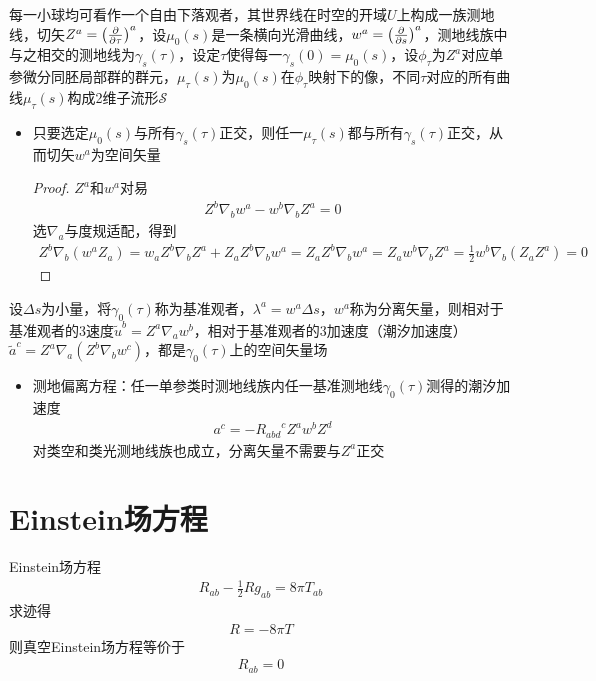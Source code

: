 每一小球均可看作一个自由下落观者，其世界线在时空的开域$U$上构成一族测地线，切矢$Z^a=\left(\frac{\partial }{\partial \tau}\right)^a$，设$\mu_0(s)$是一条横向光滑曲线，$w^a=\left(\frac{\partial }{\partial s}\right)^a$，测地线族中与之相交的测地线为$\gamma_s(\tau)$，设定$\tau$使得每一$\gamma_s(0)=\mu_0(s)$，设$\phi_{\tau}$为$Z^a$对应单参微分同胚局部群的群元，$\mu_{\tau}(s)$为$\mu_0(s)$在$\phi_{\tau}$映射下的像，不同$\tau$对应的所有曲线$\mu_{\tau}(s)$构成2维子流形$\mathscr{S}$
\begin{itemize}
    \item 只要选定$\mu_0(s)$与所有$\gamma_s(\tau)$正交，则任一$\mu_{\tau}(s)$都与所有$\gamma_s(\tau)$正交，从而切矢$w^a$为空间矢量
    \begin{proof}
        $Z^a$和$w^a$对易
        \begin{gather*}
            Z^b \nabla_b w^a-w^b \nabla_b Z^a=0
        \end{gather*}
        选$\nabla_a$与度规适配，得到
        \begin{gather*}
            Z^b \nabla_b (w^a Z_a)=w_a Z^b \nabla_b Z^a+Z_a Z^b \nabla_b w^a=Z_a Z^b \nabla_b w^a=Z_a w^b \nabla_b Z^a=\frac{1}{2} w^b \nabla_b (Z_a Z^a)=0
        \end{gather*}
    \end{proof}
\end{itemize}

设$\Delta s$为小量，将$\gamma_0(\tau)$称为基准观者，$\lambda^a=w^a \Delta s$，$w^a$称为分离矢量，则相对于基准观者的3速度$\tilde{u}^b=Z^a \nabla_a w^b$，相对于基准观者的3加速度（潮汐加速度）$\tilde{a}^c=Z^a \nabla_a (Z^b \nabla_b w^c)$，都是$\gamma_0(\tau)$上的空间矢量场
\begin{itemize}
    \item 测地偏离方程：任一单参类时测地线族内任一基准测地线$\gamma_0(\tau)$测得的潮汐加速度
    \begin{gather*}
        a^c=-{R_{abd}}^c Z^a w^b Z^d
    \end{gather*}
    对类空和类光测地线族也成立，分离矢量不需要与$Z^a$正交
\end{itemize}

\section{Einstein场方程}

Einstein场方程
\begin{gather*}
    R_{ab}-\frac{1}{2}Rg_{ab}=8\pi T_{ab}
\end{gather*}
求迹得
\begin{gather*}
    R=-8\pi T
\end{gather*}
则真空Einstein场方程等价于
\begin{gather*}
    R_{ab}=0
\end{gather*}

